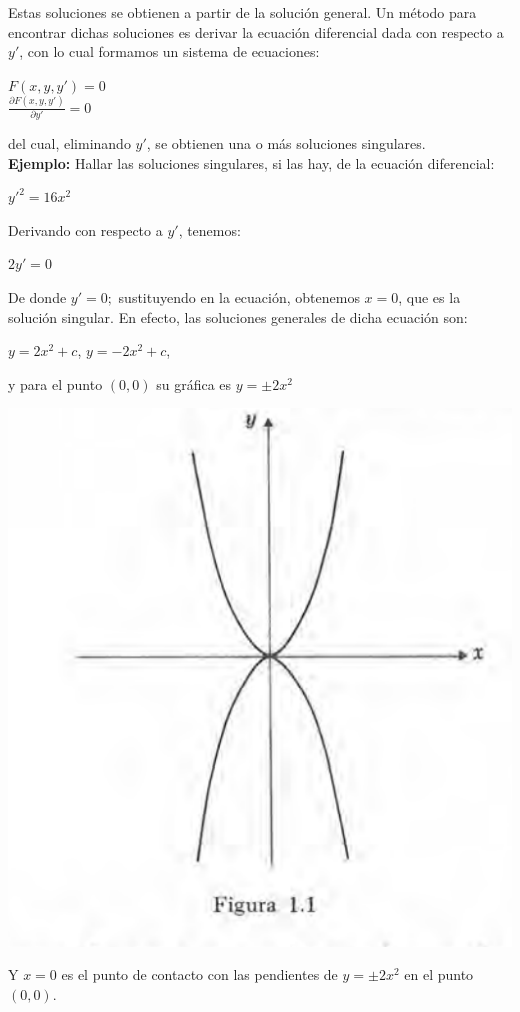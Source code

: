\documentclass{article}
\begin{document}
\begin{description}
Estas soluciones se obtienen a partir de la solución general. Un método para encontrar dichas soluciones es derivar la ecuación diferencial dada con respecto a $y'$, con lo cual formamos un sistema de ecuaciones:\\
\begin{center}$F(x,y,y') = 0$ \\\break $\frac{\partial F(x,y,y')}{\partial y'} = 0$ \end{center}
del cual, eliminando $y'$, se obtienen una o más soluciones singulares.\\
\textbf{Ejemplo:} Hallar las soluciones singulares, si las hay, de la ecuación diferencial:\\
\begin{center}$y'^{2} = 16x^2$\end{center}
Derivando con respecto a $y'$, tenemos:\\
\begin{center}$2y' = 0$\end{center}
De donde $y' = 0;$ sustituyendo en la ecuación, obtenemos $x = 0$, que es la solución singular.
En efecto, las soluciones generales de dicha ecuación son:
\begin{center}$y=2x^2+c$, $y=-2x^2+c$, \end{center}
y para el punto $(0,0)$ su gráfica es $y = \pm2x^2$\\
\begin{center}\includegraphics[scale=.55]{ed_sol_cingular.PNG}\end{center}
Y $x = 0$ es el punto de contacto con las pendientes de $y = \pm2x^2$ en el punto $(0,0)$.
\end{description}
\printbibliography
\end{document}
